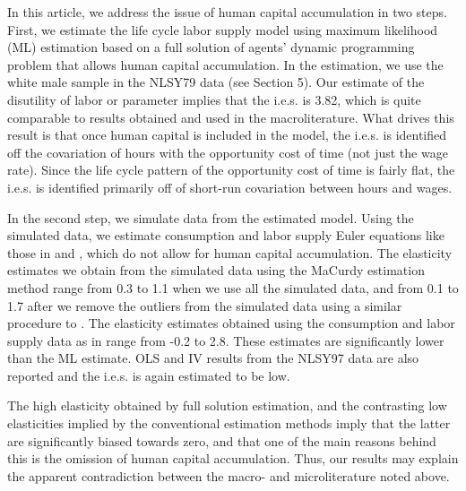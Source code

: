 \documentclass{article}
\begin{document}

In this article, we address the issue of human capital accumulation in two steps. First, we estimate the life cycle labor supply model using maximum likelihood (ML) estimation based on a full solution of agents' dynamic programming problem that allows human capital accumulation. In the estimation, we use the white male sample in the NLSY79 data (see Section 5). Our estimate of the disutility of labor or parameter implies that the i.e.s. is 3.82, which is quite comparable to results obtained and used in the macroliterature. What drives this result is that once human capital is included in the model, the i.e.s. is identified off the covariation of hours with the opportunity cost of time (not just the wage rate). Since the life cycle pattern of the opportunity cost of time is fairly flat, the i.e.s. is identified primarily off of short-run covariation between hours and wages. \par
In the second step, we simulate data from the estimated model. Using the simulated data, we estimate consumption and labor supply Euler equations like those in  \cite{MaCurdy1981-iy} and \cite{Altonji1986-zf}, which do not allow for human capital accumulation. The elasticity estimates we obtain from the simulated data using the MaCurdy estimation method range from 0.3 to 1.1 when we use all the simulated data, and from 0.1 to 1.7 after we remove the outliers from the simulated data using a similar procedure to \cite{MaCurdy1981-iy}. The elasticity estimates obtained using the consumption and labor supply data as in  \cite{Altonji1986-zf} range from -0.2 to 2.8. These estimates are significantly lower than the ML estimate. OLS and IV results from the NLSY97 data are also reported and the i.e.s. is again estimated to be low. \par
The high elasticity obtained by full solution estimation, and the contrasting low elasticities implied by the conventional estimation methods imply that the latter are significantly biased towards zero, and that one of the main reasons behind this is the omission of human capital accumulation. Thus, our results may explain the apparent contradiction between the macro- and microliterature noted above. \par
\end{document}
